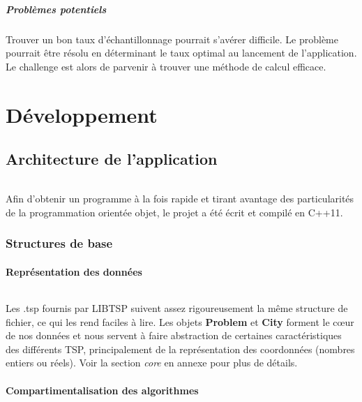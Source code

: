 \documentclass[a4paper,10pt]{report}
\begin{document}
\subsubsection{Problèmes potentiels}
Trouver un bon taux d'échantillonnage pourrait s'avérer difficile. Le problème
pourrait être résolu en déterminant le taux optimal au lancement de
l'application. Le challenge est alors de parvenir à trouver une méthode de
calcul efficace.


\part{Développement}
\chapter{Architecture de l'application}

\paragraph{}
  Afin d'obtenir un programme à la fois rapide et tirant avantage des
particularités de la programmation orientée objet, le projet a été écrit et
compilé en C++11.

\section{Structures de base}
\subsection{Représentation des données}
\paragraph{}
  Les .tsp fournis par LIBTSP suivent assez rigoureusement la même structure de
fichier, ce qui les rend faciles à lire. Les objets \textbf{Problem} et
\textbf{City} forment le cœur de nos données et nous servent à faire abstraction
de certaines caractéristiques des différents TSP, principalement de la
représentation des coordonnées (nombres entiers ou réels). Voir la section
\textit{core} en annexe pour plus de détails.

\subsection{Compartimentalisation des algorithmes}
\end{document}
